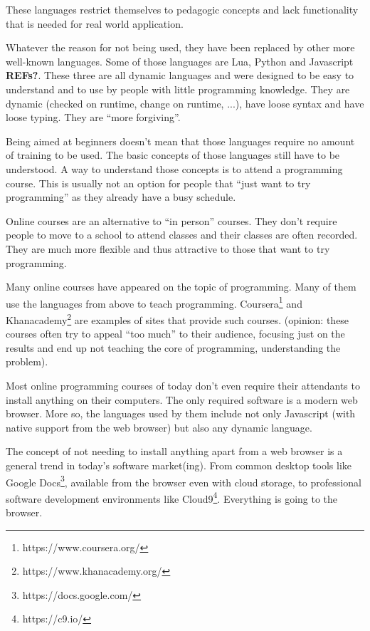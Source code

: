 \documentclass{./llncs2e/llncs}
\begin{document}
These languages restrict themselves to pedagogic concepts and lack functionality that is needed for real world application.

Whatever the reason for not being used, they have been replaced by other more well-known languages. Some of those languages are Lua, Python and Javascript \textbf{REFs?}. These three are all dynamic languages and were designed to be easy to understand and to use by people with little programming knowledge. They are dynamic (checked on runtime, change on runtime, ...), have loose syntax and have loose typing. They are ``more forgiving''.

Being aimed at beginners doesn't mean that those languages require no amount of training to be used. The basic concepts of those languages still have to be understood. A way to understand those concepts is to attend a programming course. This is usually not an option for people that ``just want to try programming'' as they already have a busy schedule.

Online courses are an alternative to ``in person'' courses. They don't require people to move to a school to attend classes and their classes are often recorded. They are much more flexible and thus attractive to those that want to try programming.

Many online courses have appeared on the topic of programming. Many of them use the languages from above to teach programming. Coursera\footnote{https://www.coursera.org/} and Khanacademy\footnote{https://www.khanacademy.org/} are examples of sites that provide such courses. (opinion: these courses often try to appeal ``too much'' to their audience, focusing just on the results and end up not teaching the core of programming, understanding the problem).

Most online programming courses of today don't even require their attendants to install anything on their computers. The only required software is a modern web browser. More so, the languages used by them include not only Javascript (with native support from the web browser) but also any dynamic language.

The concept of not needing to install anything apart from a web browser is a general trend in today's software market(ing). From common desktop tools like Google Docs\footnote{https://docs.google.com/}, available from the browser even with cloud storage, to professional software development environments like Cloud9\footnote{https://c9.io/}. Everything is going to the browser.
\end{document}
